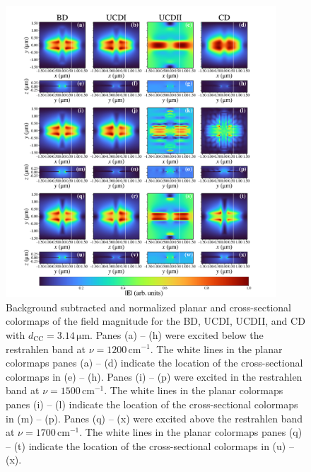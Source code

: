\documentclass[preprint,
amsmath,amssymb,
aip,
jap,
floatfix,]{revtex4-2}
\begin{document}
				\begin{figure}[!htb]
				  \centering\includegraphics[width=0.9\textwidth]{Figures/Fig4.pdf}
				  \caption{ Background subtracted and normalized planar and cross-sectional colormaps of the field magnitude for the BD, UCDI, UCDII, and CD with $d_\mathrm{CC} = 3.14 \, \si{\um}$.  Panes (a) -- (h) were excited below the restrahlen band at $\nu = 1200 \, \mathrm{cm}^{-1}$. The white lines in the planar colormaps panes (a) -- (d) indicate the location of the cross-sectional colormaps in (e) -- (h). Panes (i) -- (p) were excited in the restrahlen band at $\nu = 1500 \, \mathrm{cm}^{-1}$. The white lines in the planar colormaps panes (i) -- (l) indicate the location of the cross-sectional colormaps in (m) -- (p). Panes (q) -- (x) were excited above the restrahlen band at $\nu = 1700 \, \mathrm{cm}^{-1}$. The white lines in the planar colormaps panes (q) -- (t) indicate the location of the cross-sectional colormaps in (u) -- (x). 
				  }
				  \label{fig:4}
				\end{figure}
\end{document}
